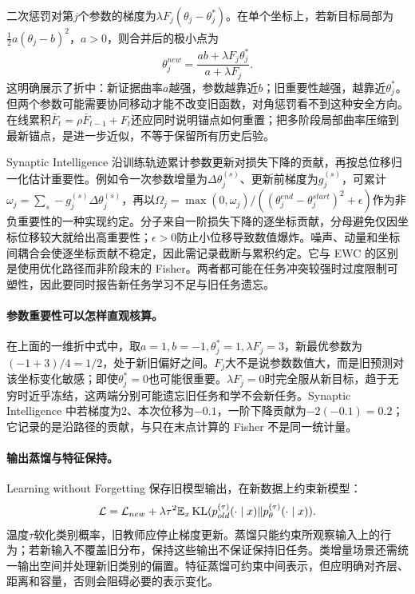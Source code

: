 二次惩罚对第$j$个参数的梯度为$\lambda F_j(\theta_j-\theta_j^*)$。在单个坐标上，若新目标局部为$\tfrac12a(\theta_j-b)^2$，$a>0$，则合并后的极小点为
\begin{equation}
 \theta_j^{new}=\frac{ab+\lambda F_j\theta_j^*}{a+\lambda F_j}.
\end{equation}
这明确展示了折中：新证据曲率$a$越强，参数越靠近$b$；旧重要性越强，越靠近$\theta_j^*$。但两个参数可能需要协同移动才能不改变旧函数，对角惩罚看不到这种安全方向。在线累积$\bar F_t=\rho\bar F_{t-1}+F_t$还应同时说明锚点如何重置；把多阶段局部曲率压缩到最新锚点，是进一步近似，不等于保留所有历史后验。

Synaptic Intelligence 沿训练轨迹累计参数更新对损失下降的贡献，再按总位移归一化估计重要性\cite{zenke2017si}。例如令一次参数增量为$\Delta\theta_j^{(s)}$、更新前梯度为$g_j^{(s)}$，可累计$\omega_j=\sum_s-g_j^{(s)}\Delta\theta_j^{(s)}$，再以$\Omega_j=\max(0,\omega_j)/((\theta_j^{end}-\theta_j^{start})^2+\epsilon)$作为非负重要性的一种实现约定。分子来自一阶损失下降的逐坐标贡献，分母避免仅因坐标位移较大就给出高重要性；$\epsilon>0$防止小位移导致数值爆炸。噪声、动量和坐标间耦合会使逐坐标贡献不稳定，因此需记录截断与累积约定。它与 EWC 的区别是使用优化路径而非阶段末的 Fisher。两者都可能在任务冲突较强时过度限制可塑性，因此要同时报告新任务学习不足与旧任务遗忘。

\paragraph{参数重要性可以怎样直观核算。}
在上面的一维折中式中，取$a=1,b=-1,\theta_j^*=1,\lambda F_j=3$，新最优参数为$(-1+3)/4=1/2$，处于新旧偏好之间。$F_j$大不是说参数数值大，而是旧预测对该坐标变化敏感；即使$\theta_j^*=0$也可能很重要。$\lambda F_j=0$时完全服从新目标，趋于无穷时近乎冻结，这两端分别可能遗忘旧任务和学不会新任务。Synaptic Intelligence 中若梯度为$2$、本次位移为$-0.1$，一阶下降贡献为$-2(-0.1)=0.2$；它记录的是沿路径的贡献，与只在末点计算的 Fisher 不是同一统计量。

\paragraph{输出蒸馏与特征保持。}
Learning without Forgetting 保存旧模型输出，在新数据上约束新模型\cite{li2017lwf}：
\begin{equation}
 \mathcal L=\mathcal L_{new}+\lambda\tau^2
 \mathbb{E}_x\operatorname{KL}(p_{old}^{(\tau)}(\cdot\mid x)\|p_\theta^{(\tau)}(\cdot\mid x)).
\end{equation}
温度$\tau$软化类别概率，旧教师应停止梯度更新。蒸馏只能约束所观察输入上的行为；若新输入不覆盖旧分布，保持这些输出不保证保持旧任务。类增量场景还需统一输出空间并处理新旧类别的偏置。特征蒸馏可约束中间表示，但应明确对齐层、距离和容量，否则会阻碍必要的表示变化。

